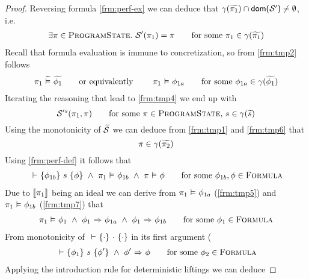 \begin{proof}
    Reversing formula \ref{frm:perf-ex} we can deduce that $\gamma(\widetilde{\pi_1}) \cap \textup{\textmd{\textsf{dom($\mathcal{S}'$)}}} \neq \emptyset$, i.e.
    \begin{align}
    \exists \pi \in \textup{\textsc{ProgramState}}.~ \mathcal{S}'(\pi_1) = \pi 
    \quad\quad\text{for some } \pi_1 \in \gamma(\widetilde{\pi_1})
    \label{frm:tmp4}
    \end{align}
    Recall that formula evaluation is immune to concretization, so from \ref{frm:tmp2} follows
    \begin{align}
    \pi_1 \,\,\widetilde{\vDash}\,\, \widetilde{\phi_1}
    \text{\quad\quad or equivalently \quad\quad}
    \pi_1 \,\,{\vDash}\,\, \phi_{1a}
    \quad\quad\text{for some } \phi_{1a} \in \gamma(\widetilde{\phi_1}) 
    \label{frm:tmp5}
    \end{align}
    Iterating the reasoning that lead to \ref{frm:tmp4} we end up with
    \begin{displaymath}
    \mathcal{S}'^s(\pi_1, \pi)
    \quad\quad\text{for some } \pi \in \textup{\textsc{ProgramState}},\, s \in \gamma(\widetilde{s}) 
    \label{frm:tmp6}
    \end{displaymath}
    Using the monotonicity of $\widetilde{\mathcal{S}}$ we can deduce from \ref{frm:tmp1} and \ref{frm:tmp6} that
    \begin{displaymath}
    \pi \in \gamma(\widetilde{\pi_2})
    \label{frm:tmp6x}
    \end{displaymath}
    Using \ref{frm:perf-def} it follows that
    \begin{align}
    {} \,\,{\vdash}\,\, \{{\phi_{1b}}\} ~{s}~ \{{\phi}\} ~\wedge~ \pi_1 \,\,{\vDash}\,\, \phi_{1b} ~\wedge~ \pi \,\,{\vDash}\,\, \phi
    \quad\quad\text{for some } \phi_{1b}, \phi \in \textup{\textsc{Formula}}
    \label{frm:tmp7}
    \end{align}
    Due to $\llbracket \pi_1 \rrbracket$ being an ideal we can derive from $\pi_1 \,\,{\vDash}\,\, \phi_{1a}$ (\ref{frm:tmp5}) and $\pi_1 \,\,{\vDash}\,\, \phi_{1b}$ (\ref{frm:tmp7}) that
    \begin{align}
    \pi_1 \,\,{\vDash}\,\, \phi_1 ~\wedge~ {\phi_1} \,\,{\Rightarrow}\,\, {\phi_{1a}} ~\wedge~ {\phi_1} \,\,{\Rightarrow}\,\, {\phi_{1b}}
    \quad\quad\text{for some } \phi_1 \in \textup{\textsc{Formula}}
    \label{frm:tmp8}
    \end{align}
    From monotonicity of ${} \,\,{\vdash}\,\, \{{\cdot}\} ~{\cdot}~ \{{\cdot}\}$ in its first argument (%
    \begin{align}
    {} \,\,{\vdash}\,\, \{{\phi_1}\} ~{s}~ \{{\phi'}\} ~\wedge~ {\phi'} \,\,{\Rightarrow}\,\, {\phi}
    \quad\quad\text{for some } \phi_2 \in \textup{\textsc{Formula}}
    \label{frm:tmp9}
    \end{align}
    Applying the introduction rule for deterministic liftings we can deduce

\end{proof}
